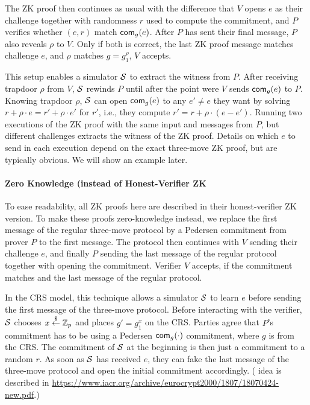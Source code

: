 \documentclass{article}
\begin{document}
The ZK proof then continues as usual with the difference that $V$
opens $e$ as their challenge together with randomness $r$ used to
compute the commitment, and $P$ verifies whether $(e,r)$ match
$\mathsf{com}_g(e)$.  After $P$ has sent their final message, $P$ also reveals
$\rho$ to $V$. Only if both is correct, the last ZK proof message
matches  challenge $e$, and $\rho$ matches $g=g_1^\rho$, $V$ accepts.

This setup enables a simulator ${\mathcal{S}}$ to extract the witness from
$P$. After receiving trapdoor $\rho$ from $V$, ${\mathcal{S}}$ rewinds $P$ until
after the point were $V$ sends $\mathsf{com}_g(e)$ to $P$. Knowing trapdoor
$\rho$, ${\mathcal{S}}$ can open $\mathsf{com}_g(e)$ to any $e'\neq{}e$ they want by
solving $r+\rho\cdot{}e=r'+\rho\cdot{}e'$ for $r'$, i.e., they compute
$r'=r+\rho\cdot{}(e-e')$. Running two executions of the ZK proof with the
same input and messages from $P$, but different challenges extracts
the witness of the ZK proof. Details on which $e$ to send in each
execution depend on the exact three-move ZK proof, but are typically
obvious. We will show an example later.

\paragraph{Zero Knowledge (instead of Honest-Verifier ZK}
To ease readability, all  ZK proofs here are described in their
honest-verifier ZK version. To make these proofs zero-knowledge
instead, we replace the first message of the regular three-move protocol by a
Pedersen commitment from prover $P$ to the first message. The protocol
then continues with $V$ sending their challenge $e$, and finally $P$
sending the last message of the regular protocol together with opening
the commitment. Verifier $V$ accepts, if the commitment matches and
the last message of the regular protocol.

In the CRS model, this technique allows a simulator ${\mathcal{S}}$ to learn
$e$ before sending the first message of the three-move
protocol. Before interacting with the verifier, ${\mathcal{S}}$ chooses
$x\stackrel{\$}{\leftarrow}\mathbb{Z}_p$ and places $g'=g_1^x$ on the CRS. Parties agree that $P$'s
commitment has to be using a Pedersen $\mathsf{com}_g(\cdot)$ commitment,
where $g$ is from the CRS. The commitment of ${\mathcal{S}}$ at the beginning
is then just a commitment to a random $r$. As soon as ${\mathcal{S}}$ has
received $e$, they can fake the last message of the three-move
protocol and open the initial commitment accordingly.
( idea is
described in
\url{https://www.iacr.org/archive/eurocrypt2000/1807/18070424-new.pdf}.)
\end{document}
